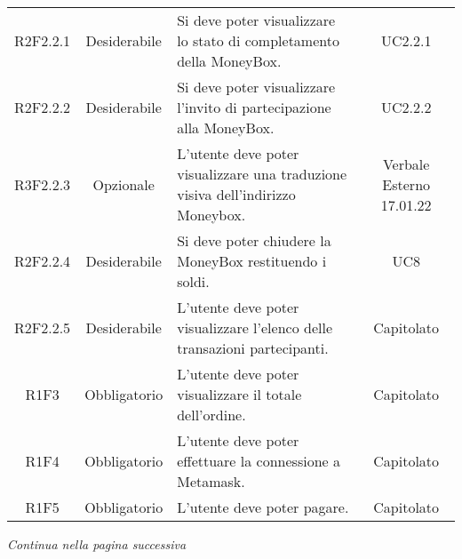 \begin{table}[H]
\begin{tabular}{c | c | p{6cm} | c}
        R2F2.2.1                                                          & Desiderabile & Si deve poter visualizzare lo stato di completamento della MoneyBox\glo{}.            & UC2.2.1                  \\
        R2F2.2.2                                                          & Desiderabile & Si deve poter visualizzare l'invito di partecipazione alla MoneyBox\glo{}.            & UC2.2.2                  \\
        R3F2.2.3                                                          & Opzionale    & L'utente deve poter visualizzare una traduzione visiva dell'indirizzo Moneybox\glo{}. & Verbale Esterno 17.01.22 \\
        R2F2.2.4                                                          & Desiderabile & Si deve poter chiudere la MoneyBox\glo{} restituendo i soldi.                         & UC8                      \\
        R2F2.2.5                                                          & Desiderabile & L'utente deve poter visualizzare l'elenco delle transazioni partecipanti.             & Capitolato               \\
        R1F3                                                              & Obbligatorio & L'utente deve poter visualizzare il totale dell'ordine.                               & Capitolato               \\
        R1F4                                                              & Obbligatorio & L'utente deve poter effettuare la connessione a Metamask\glo{}.                       & Capitolato               \\
        R1F5                                                              & Obbligatorio & L'utente deve poter pagare.                                                           & Capitolato               \\
    \end{tabular}
\end{table}
\begin{center}
    \textit{\small Continua nella pagina successiva}
\end{center}
